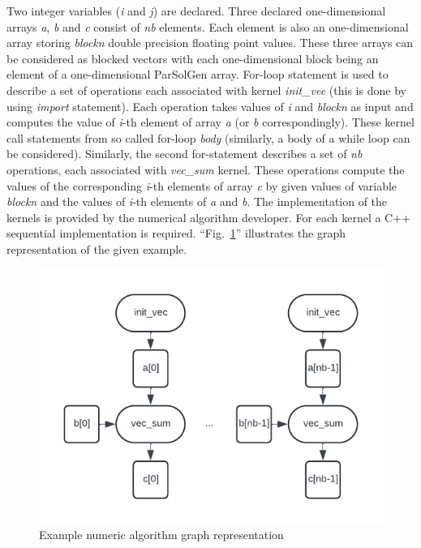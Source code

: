 \documentclass[conference]{IEEEtran}
\begin{document}
Two integer variables (\textit{i} and \textit{j}) are declared. Three declared one-dimensional arrays \textit{a}, \textit{b} and \textit{c} 
consist of \textit{nb} elements. Each element is also an one-dimensional array storing \textit{blockn} double 
precision floating point values. These three arrays can be considered as blocked vectors with each one-dimensional 
block being an element of a one-dimensional ParSolGen array. 
For-loop statement is used to describe a set of operations 
each associated with kernel \textit{init\_vec} (this is done by using \textit{import} statement). 
Each operation takes values of 
\textit{i} and \textit{blockn} as input and computes the value of \textit{i}-th element of array \textit{a} (or 
\textit{b} correspondingly). These kernel call statements from so called for-loop \textit{body} (similarly, 
a body of a while loop can be considered). 
Similarly, the second for-statement describes a set of \textit{nb} operations, each 
associated with \textit{vec\_sum} kernel. These operations compute the values of the corresponding \textit{i}-th 
elements of array \textit{c} by given values of variable \textit{blockn} and the values of \textit{i}-th elements of
\textit{a} and \textit{b}. The implementation of the kernels is provided by the numerical algorithm developer. For 
each kernel a C++ sequential implementation is required. 
``Fig.~\ref{fig_1}'' illustrates the graph representation of the given example.
\begin{figure}[htbp]
	\centerline{\includegraphics[scale=0.6]{fig_1.png}}
	\caption{Example numeric algorithm graph representation}
	\label{fig_1}
\end{figure}
\end{document}
